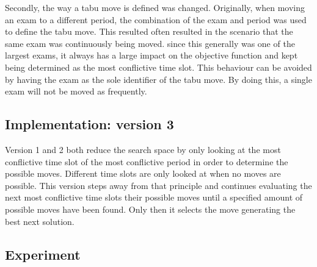 Secondly, the way a tabu move is defined was changed. Originally, when moving an exam to a different period, the combination of the exam and period was used to define the tabu move. This resulted often resulted in the scenario that the same exam was continuously being moved. since this generally was one of the largest exams, it always has a large impact on the objective function and kept being determined as the most conflictive time slot. This behaviour can be avoided by having the exam as the sole identifier of the tabu move. By doing this, a single exam will not be moved as frequently.

\subsection{Implementation: version 3}

Version 1 and 2 both reduce the search space by only looking at the most conflictive time slot of the most conflictive period in order to determine the possible moves. Different time slots are only looked at when no moves are possible. This version steps away from that principle and continues evaluating the next most conflictive time slots their possible moves until a specified amount of possible moves have been found. Only then it selects the move generating the best next solution.

\subsection{Experiment}

